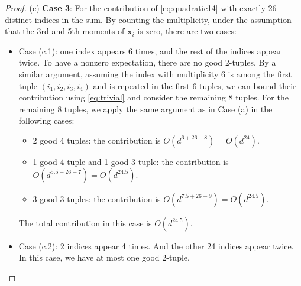 \documentclass[twoside,11pt]{article}
\def\bx{{\boldsymbol x}}
\newcommand{\1}{\mathbf{1}}
\begin{document}
\begin{proof}
      (c) \textbf{Case 3}: For the contribution of \eqref{eq:quadratic14} with exactly 26 distinct indices in the sum. By counting the multiplicity, under the assumption that the 3rd and 5th moments of $\bx_i$ is zero, there are two cases: 
       \begin{itemize}
       \item Case (c.1): one index appears 6 times, and the rest of the indices appear twice. To have a nonzero expectation, there are no good 2-tuples.
       By a similar argument,  assuming the index with multiplicity 6 is among the first tuple $(i_1,i_2,i_3,i_4)$ and is repeated in the first 6 tuples, we can bound their contribution using \eqref{eq:trivial} and consider the remaining 8 tuples. For the remaining 8 tuples, we apply the same argument as in Case (a) in the following cases:
       \begin{itemize}
           \item 2 good 4 tuples: the contribution is $O(d^{6+26-8})=O(d^{24})$.
           \item 1 good 4-tuple and 1 good 3-tuple: the contribution is $O(d^{5.5+26-7})=O(d^{24.5})$.
           \item 3 good 3 tuples: the contribution is $O(d^{7.5+26-9})=O(d^{24.5})$.
       \end{itemize}
       
       The total contribution in this case is $O(d^{24.5})$.

       
       \item Case (c.2): 2 indices appear 4 times. And the other 24 indices appear twice. In this case, we have at most one good 2-tuple. 
       

\end{itemize}
\end{proof}
\end{document}
